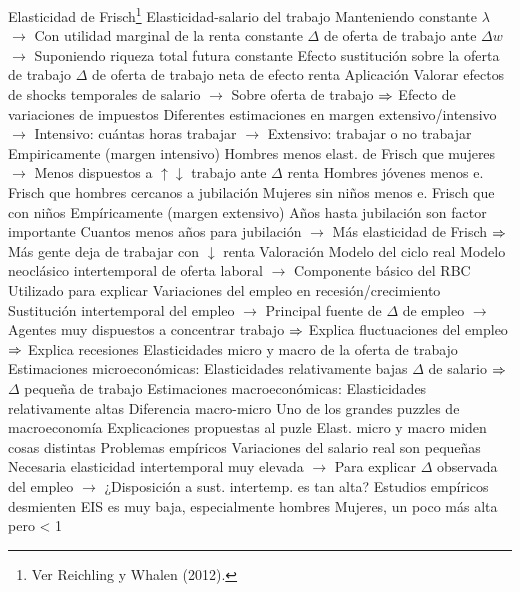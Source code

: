\documentclass{nuevotema}
\begin{document}
\begin{esquemal}
			\3 Elasticidad de Frisch\footnote{Ver Reichling y Whalen (2012).}
				\4 Elasticidad-salario del trabajo
				\4[] Manteniendo constante $\lambda$
				\4[] $\to$ Con utilidad marginal de la renta constante
				\4 $\Delta$ de oferta de trabajo ante $\Delta w$
				\4[] $\to$ Suponiendo riqueza total futura constante
				\4[$\then$] Efecto sustitución sobre la oferta de trabajo
				\4[$\then$] $\Delta$ de oferta de trabajo neta de efecto renta
				\4 Aplicación
				\4[] Valorar efectos de shocks temporales de salario
				\4[] $\to$ Sobre oferta de trabajo
				\4[] $\then$ Efecto de variaciones de impuestos
				\4[] Diferentes estimaciones en margen extensivo/intensivo
				\4[] $\to$ Intensivo: cuántas horas trabajar
				\4[] $\to$ Extensivo: trabajar o no trabajar
				\4 Empiricamente (margen intensivo)
				\4[] Hombres menos elast. de Frisch que mujeres
				\4[] $\to$ Menos dispuestos a $\uparrow \downarrow$ trabajo ante $\Delta$ renta
				\4[] Hombres jóvenes menos e. Frisch que hombres cercanos a jubilación
				\4[] Mujeres sin niños menos e. Frisch que con niños
				\4 Empíricamente (margen extensivo)
				\4[] Años hasta jubilación son factor importante
				\4[] Cuantos menos años para jubilación
				\4[] $\to$ Más elasticidad de Frisch
				\4[] $\then$ Más gente deja de trabajar con $\downarrow$ renta
		\2 Valoración
			\3 Modelo del ciclo real
				\4 Modelo neoclásico intertemporal de oferta laboral
				\4[] $\to$ Componente básico del RBC
				\4 Utilizado para explicar
				\4[] Variaciones del empleo en recesión/crecimiento
				\4 Sustitución intertemporal del empleo
				\4[] $\to$ Principal fuente de $\Delta$ de empleo
				\4[] $\to$ Agentes muy dispuestos a concentrar trabajo
				\4[] $\then$ Explica fluctuaciones del empleo
				\4[] $\then$ Explica recesiones
			\3 Elasticidades micro y macro de la oferta de trabajo
				\4 Estimaciones microeconómicas:
				\4[] Elasticidades relativamente bajas
				\4[] $\Delta$ de salario $\then$ $\Delta$ pequeña de trabajo
				\4 Estimaciones macroeconómicas:
				\4[] Elasticidades relativamente altas
				\4 Diferencia macro-micro
				\4[] Uno de los grandes puzzles de macroeconomía
				\4 Explicaciones propuestas al puzle
				\4[] Elast. micro y macro miden cosas distintas
			\3 Problemas empíricos
				\4 Variaciones del salario real son pequeñas
				\4[] Necesaria elasticidad intertemporal muy elevada
				\4[] $\to$ Para explicar $\Delta$ observada del empleo
				\4[] $\to$ ¿Disposición a sust. intertemp. es tan alta?
				\4 Estudios empíricos desmienten
				\4[] EIS es muy baja, especialmente hombres
				\4[] Mujeres, un poco más alta pero < 1

\end{esquemal}
\end{document}
